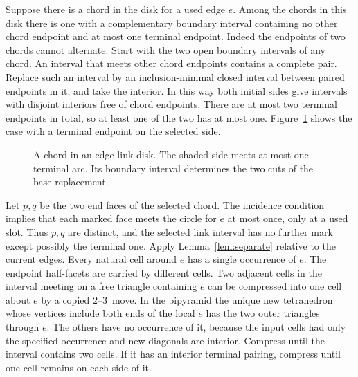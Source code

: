 \documentclass[11pt]{amsart}
\newcommand{\moveup}{\(2\)--\(3\)}
\begin{document}
Suppose there is a chord in the disk for a used edge \(e\).
Among the chords in this disk there is one with a complementary
boundary interval containing no other chord endpoint and at most one
terminal endpoint. Indeed the endpoints of two chords cannot
alternate. Start with the two open boundary intervals of any chord.
An interval that meets other chord endpoints contains a complete pair.
Replace such an interval by
an inclusion-minimal closed interval between paired endpoints in it,
and take the interior. In this way both initial sides give intervals
with disjoint interiors free of chord endpoints. There are at most two
terminal endpoints in total, so at least one of the two has at most one.
Figure~\ref{fig:ear} shows the case with a terminal endpoint on the
selected side.

\begin{figure}[ht]
\centering
{}
\caption{A chord in an edge-link disk. The shaded side meets at most one
terminal arc. Its boundary interval determines the two cuts of the base
replacement.}
\label{fig:ear}
\end{figure}

Let \(p,q\) be the two end faces of the selected chord. The incidence
condition implies that each marked face meets the circle for \(e\) at
most once, only at a used slot. Thus \(p,q\) are distinct, and the
selected link interval has no further mark except possibly the terminal
one. Apply Lemma~\ref{lem:separate} relative to the current edges.
Every natural cell around \(e\) has a single occurrence of \(e\).
The endpoint half-facets are carried by different cells. Two adjacent
cells in the interval meeting on a free triangle containing \(e\) can
be compressed into one cell about \(e\) by a copied \moveup\ move. In
the bipyramid the unique new tetrahedron whose vertices include both
ends of the local \(e\) has the two outer triangles through \(e\).
The others have no occurrence of it, because the input cells had
only the specified occurrence and new diagonals are interior. Compress
until the interval contains two cells. If it has an interior terminal
pairing, compress until one cell remains on each side of it.
\end{document}

